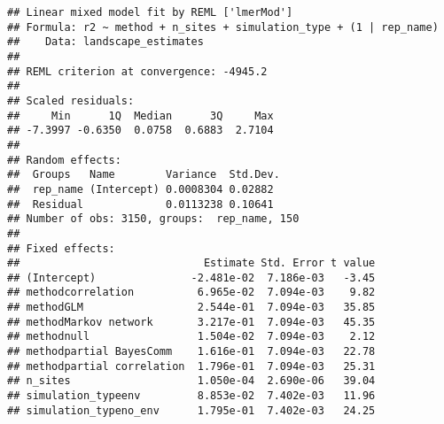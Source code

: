 \documentclass[11pt,]{article}
\newenvironment{Shaded}{\begin{snugshade}}{\end{snugshade}}
\newcommand{\KeywordTok}[1]{\textcolor[rgb]{0.13,0.29,0.53}{\textbf{{#1}}}}
\newcommand{\DataTypeTok}[1]{\textcolor[rgb]{0.13,0.29,0.53}{{#1}}}
\newcommand{\DecValTok}[1]{\textcolor[rgb]{0.00,0.00,0.81}{{#1}}}
\newcommand{\StringTok}[1]{\textcolor[rgb]{0.31,0.60,0.02}{{#1}}}
\newcommand{\OtherTok}[1]{\textcolor[rgb]{0.56,0.35,0.01}{{#1}}}
\newcommand{\NormalTok}[1]{{#1}}
\begin{document}
\begin{Shaded}
\end{Shaded}

\begin{verbatim}
## Linear mixed model fit by REML ['lmerMod']
## Formula: r2 ~ method + n_sites + simulation_type + (1 | rep_name)
##    Data: landscape_estimates
## 
## REML criterion at convergence: -4945.2
## 
## Scaled residuals: 
##     Min      1Q  Median      3Q     Max 
## -7.3997 -0.6350  0.0758  0.6883  2.7104 
## 
## Random effects:
##  Groups   Name        Variance  Std.Dev.
##  rep_name (Intercept) 0.0008304 0.02882 
##  Residual             0.0113238 0.10641 
## Number of obs: 3150, groups:  rep_name, 150
## 
## Fixed effects:
##                             Estimate Std. Error t value
## (Intercept)               -2.481e-02  7.186e-03   -3.45
## methodcorrelation          6.965e-02  7.094e-03    9.82
## methodGLM                  2.544e-01  7.094e-03   35.85
## methodMarkov network       3.217e-01  7.094e-03   45.35
## methodnull                 1.504e-02  7.094e-03    2.12
## methodpartial BayesComm    1.616e-01  7.094e-03   22.78
## methodpartial correlation  1.796e-01  7.094e-03   25.31
## n_sites                    1.050e-04  2.690e-06   39.04
## simulation_typeenv         8.853e-02  7.402e-03   11.96
## simulation_typeno_env      1.795e-01  7.402e-03   24.25
\end{verbatim}
\end{document}
